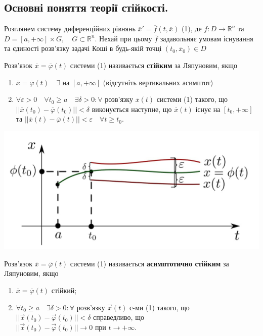 \documentclass[14pt,a4paper]{scrartcl}
\theoremstyle{definition}
\theoremstyle{remark}
\theoremstyle{definition}
\theoremstyle{definition}
\begin{document}
\subsection{Основні поняття теорії стійкості.}
Розглянем систему диференційних рівнянь $\overline{x}' = \overline{f}(t, \overline{x})$ (1), де $f : D \rightarrow \mathbb{R}^n$ та $D = [a, +\infty] \times G, \quad G \subset \mathbb{R}^n$. Нехай при цьому $\overline{f}$ задавольняє умовам існування та єдиності розв'язку задачі Коші в будь-якій точці $(t_0, \overline{x}_0) \in D$

\bd
Розв'язок $\overline{x} = \overline{\varphi}(t)$ системи (1) називається \textbf{стійким} за Ляпуновим, якщо

\begin{enumerate}
  \item $\overline{x} = \overline{\varphi}(t) \quad \exists  \text{ на } [a, +\infty]$ (відсутніть вертикальних асимптот)
  \item $\forall \varepsilon > 0 \quad \forall t_0 \geq a \quad \exists \delta > 0 : \forall $ розв'язку $\overline{x}(t)$ системи (1) такого, що $||\overline{x}(t_0) - \overline{\varphi}(t_0)|| < \delta$ виконується наступне, що $\overline{x}(t)$ існує на $[t_0, +\infty]$ та $||\overline{x}(t) - \overline{\varphi}(t)|| < \varepsilon \quad \forall t \geq t_0$.
\end{enumerate}
\ed

\begin{center} \includegraphics[scale=0.35]{assets/lect1.jpg} \end{center}

\bd
Розв'язок $\overline{x} = \overline{\varphi}(t)$ системи (1) називається \textbf{асимптотично стійким} за Ляпуновим, якщо

\begin{enumerate}
  \item $\overline{x} = \overline{\varphi}(t)$ стійкий;
  \item $\forall t_0 \geq a \quad \exists \delta > 0: \forall$ розв'язку $\vec{x}(t)$ с-ми (1) такого, що $||\vec{x}(t_0) - \vec{\varphi}(t_0)|| < \delta$ справедливо, що $||\vec{x}(t_0) - \vec{\varphi}(t_0)|| \rightarrow 0 \text{ при } t \rightarrow + \infty$.
\end{enumerate}
\end{document}
